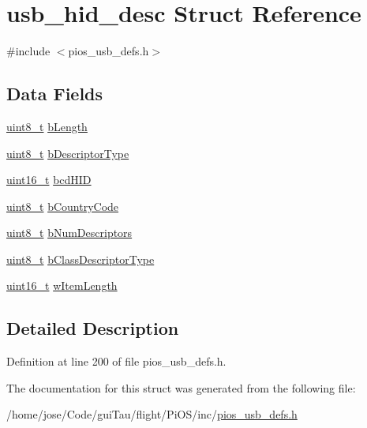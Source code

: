 \hypertarget{structusb__hid__desc}{\section{usb\-\_\-hid\-\_\-desc Struct Reference}
\label{structusb__hid__desc}
}


{\ttfamily \#include $<$pios\-\_\-usb\-\_\-defs.\-h$>$}

\subsection*{Data Fields}
\begin{DoxyCompactItemize}
\item 
\hyperlink{stdint_8h_aba7bc1797add20fe3efdf37ced1182c5}{uint8\-\_\-t} \hyperlink{group___p_i_o_s___u_s_b___d_e_f_s_ga738612f01d93af966dfd2e9fbf29e409}{b\-Length}
\item 
\hyperlink{stdint_8h_aba7bc1797add20fe3efdf37ced1182c5}{uint8\-\_\-t} \hyperlink{group___p_i_o_s___u_s_b___d_e_f_s_ga6fd7eaaf97d6f887fb38056456f79038}{b\-Descriptor\-Type}
\item 
\hyperlink{stdint_8h_a273cf69d639a59973b6019625df33e30}{uint16\-\_\-t} \hyperlink{group___p_i_o_s___u_s_b___d_e_f_s_gab7e8d21f875c12e9ed7715a78fe5bb9e}{bcd\-H\-I\-D}
\item 
\hyperlink{stdint_8h_aba7bc1797add20fe3efdf37ced1182c5}{uint8\-\_\-t} \hyperlink{group___p_i_o_s___u_s_b___d_e_f_s_gadbef4d9e2e13fd696fcf8339ee1a27b3}{b\-Country\-Code}
\item 
\hyperlink{stdint_8h_aba7bc1797add20fe3efdf37ced1182c5}{uint8\-\_\-t} \hyperlink{group___p_i_o_s___u_s_b___d_e_f_s_ga5bce1598e0b04efe977788e2027fde3a}{b\-Num\-Descriptors}
\item 
\hyperlink{stdint_8h_aba7bc1797add20fe3efdf37ced1182c5}{uint8\-\_\-t} \hyperlink{group___p_i_o_s___u_s_b___d_e_f_s_ga25fe14740813f95e5163aeb719b36d35}{b\-Class\-Descriptor\-Type}
\item 
\hyperlink{stdint_8h_a273cf69d639a59973b6019625df33e30}{uint16\-\_\-t} \hyperlink{group___p_i_o_s___u_s_b___d_e_f_s_ga86359b23d6a148a291cb15cab529444b}{w\-Item\-Length}
\end{DoxyCompactItemize}


\subsection{Detailed Description}


Definition at line 200 of file pios\-\_\-usb\-\_\-defs.\-h.



The documentation for this struct was generated from the following file\-:\begin{DoxyCompactItemize}
\item 
/home/jose/\-Code/gui\-Tau/flight/\-Pi\-O\-S/inc/\hyperlink{pios__usb__defs_8h}{pios\-\_\-usb\-\_\-defs.\-h}\end{DoxyCompactItemize}
